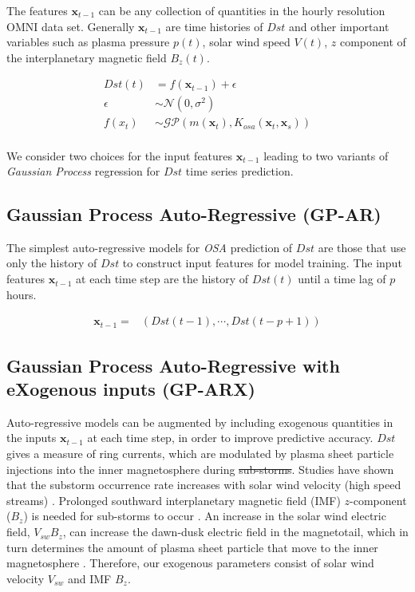 \documentclass{article}
\providecommand{\DIFadd}[1]{{\protect\color{blue}\uwave{#1}}} %
\providecommand{\DIFdel}[1]{{\protect\color{red}\sout{#1}}}                      %
\providecommand{\DIFaddbegin}{} %
\providecommand{\DIFaddend}{} %
\providecommand{\DIFdelbegin}{} %
\providecommand{\DIFdelend}{} %
\newcommand{\DIFscaledelfig}{0.5}
\newlength{\DIFdelgraphicswidth} %
\newlength{\DIFdelgraphicsheight} %
\newcommand{\DIFaddincludegraphics}[2][]{{\color{blue}\fbox{\DIFOincludegraphics[#1]{#2}}}} %
\newcommand{\DIFdelincludegraphics}[2][]{%
\sbox{\DIFdelgraphicsbox}{\DIFOincludegraphics[#1]{#2}}%
\settoboxwidth{\DIFdelgraphicswidth}{\DIFdelgraphicsbox} %
\settoboxtotalheight{\DIFdelgraphicsheight}{\DIFdelgraphicsbox} %
\scalebox{\DIFscaledelfig}{%
\parbox[b]{\DIFdelgraphicswidth}{\usebox{\DIFdelgraphicsbox}\\[-\baselineskip] \rule{\DIFdelgraphicswidth}{0em}}\llap{\resizebox{\DIFdelgraphicswidth}{\DIFdelgraphicsheight}{%
\setlength{\unitlength}{\DIFdelgraphicswidth}%
\begin{picture}(1,1)%
\thicklines\linethickness{2pt} %
{\color[rgb]{1,0,0}\put(0,0){\framebox(1,1){}}}%
{\color[rgb]{1,0,0}\put(0,0){\line( 1,1){1}}}%
{\color[rgb]{1,0,0}\put(0,1){\line(1,-1){1}}}%
\end{picture}%
}\hspace*{3pt}}} %
} %
\DeclareRobustCommand{\DIFaddbegin}{\DIFOaddbegin \let\includegraphics\DIFaddincludegraphics} %
\DeclareRobustCommand{\DIFaddend}{\DIFOaddend \let\includegraphics\DIFOincludegraphics} %
\DeclareRobustCommand{\DIFdelbegin}{\DIFOdelbegin \let\includegraphics\DIFdelincludegraphics} %
\DeclareRobustCommand{\DIFdelend}{\DIFOaddend \let\includegraphics\DIFOincludegraphics} %
\begin{document}
The features $\mathbf{x}_{t-1}$ can be any collection of quantities in the hourly resolution OMNI data set. Generally $\mathbf{x}_{t-1}$ are time histories of $Dst$ and other important variables such as plasma pressure $p(t)$, solar wind speed $V(t)$, $z$ component of the interplanetary magnetic field $B_z(t)$.


\begin{align}
  Dst(t) & =  f(\mathbf{x}_{t-1}) + \epsilon \label{eq:Dst} \\
  \epsilon & \sim  \mathcal{N}(0, \sigma^2) \label{eq:GPNoise} \\
  f(x_t) & \sim  \mathcal{GP}(m(\mathbf{x}_t), K_{osa}(\mathbf{x}_t, \mathbf{x}_s)) \label{eq:DstGP} \\
\end{align}

We consider two choices for the input features $\mathbf{x}_{t-1}$ leading to two variants of \emph{Gaussian Process} regression for $Dst$ time series prediction.

\subsection{Gaussian Process Auto-Regressive (GP-AR)} \label{sec:gpar}

The simplest auto-regressive models for \emph{OSA} prediction of $Dst$ are those that use only the history of $Dst$ to construct input features for model training. The input features $\mathbf{x}_{t-1}$ at each time step are the history of $Dst(t)$ until a time lag of $p$ hours.

\begin{align*}
  \mathbf{x}_{t-1} = & \left(Dst(t-1), \cdots , Dst(t-p+1)\right)
\end{align*}

\subsection{Gaussian Process Auto-Regressive with eXogenous inputs (GP-ARX)} \label{sec:gparx}

Auto-regressive models can be augmented by including exogenous quantities in the inputs $\mathbf{x}_{t-1}$ at each time step, in order to improve predictive accuracy. $Dst$ gives a measure of ring currents, which are modulated by plasma sheet particle injections into the inner magnetosphere during \DIFdelbegin \DIFdel{sub-storms}\DIFdelend \DIFaddbegin \DIFadd{substorms}\DIFaddend . Studies have shown that the substorm occurrence rate increases with solar wind velocity (high speed streams) \citet{Kissinger2011,Newell2016}. Prolonged southward interplanetary magnetic field (IMF) $z$-component ($B_z$) is needed for sub-storms to occur \citet{McPherron1986}. An increase in the solar wind electric field, $V_{sw}B_z$, can increase the dawn-dusk electric field in the magnetotail, which in turn determines the amount of plasma sheet particle that move to the inner magnetosphere \citet{Friedel2001}. Therefore, our exogenous parameters consist of solar wind velocity $V_{sw}$ and IMF $B_z$.   
\end{document}
